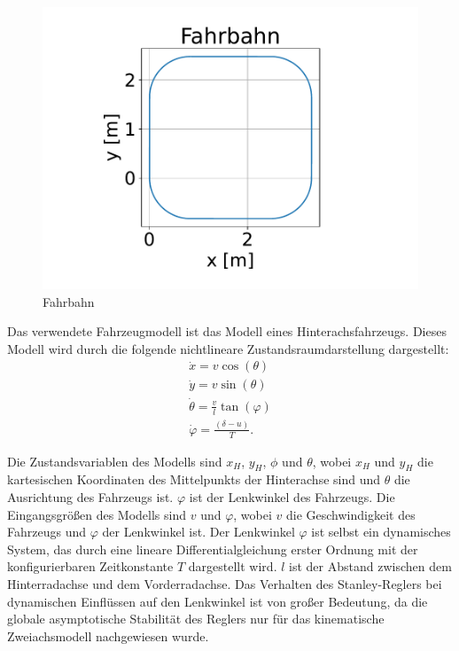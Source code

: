 \documentclass[arbeit=studie,oneside,BCOR=12mm]{ArbeitRST}
\begin{document}
\begin{figure}[h]
    \centering
    \includegraphics[scale=0.5]{Fahrbahn}
    \caption{Fahrbahn}
    \label{fahrbahn}
\end{figure}


Das verwendete Fahrzeugmodell ist das Modell eines Hinterachsfahrzeugs. Dieses
Modell wird durch die folgende nichtlineare Zustandsraumdarstellung
dargestellt: 
\begin{gather} 
  \dot{x} = v \cos(\theta) \\ 
  \dot{y} = v \sin(\theta) \\ 
  \dot{\theta} = \frac{v}{l}\tan(\varphi) \\
  \dot{\varphi} = \frac{\left(\delta-u\right)}{T}. 
\end{gather}

Die Zustandsvariablen des Modells sind $x_H$, $y_H$, $\phi$ und $\theta$, wobei
$x_H$ und $y_H$ die kartesischen Koordinaten des Mittelpunkts der Hinterachse
sind und $\theta$ die Ausrichtung des Fahrzeugs ist. $\varphi$ ist der
Lenkwinkel des Fahrzeugs. Die Eingangsgrößen des Modells sind $v$ und
$\varphi$, wobei $v$ die Geschwindigkeit des Fahrzeugs und $\varphi$ der
Lenkwinkel ist. Der Lenkwinkel $\varphi$ ist selbst ein dynamisches System, das
durch eine lineare Differentialgleichung erster Ordnung mit der
konfigurierbaren Zeitkonstante $T$ dargestellt wird. $l$ ist der Abstand
zwischen dem Hinterradachse und dem Vorderradachse.  Das Verhalten des
Stanley-Reglers bei dynamischen Einflüssen auf den Lenkwinkel ist von großer
Bedeutung, da die globale asymptotische Stabilität des Reglers nur für das
kinematische Zweiachsmodell nachgewiesen wurde.
\end{document}
